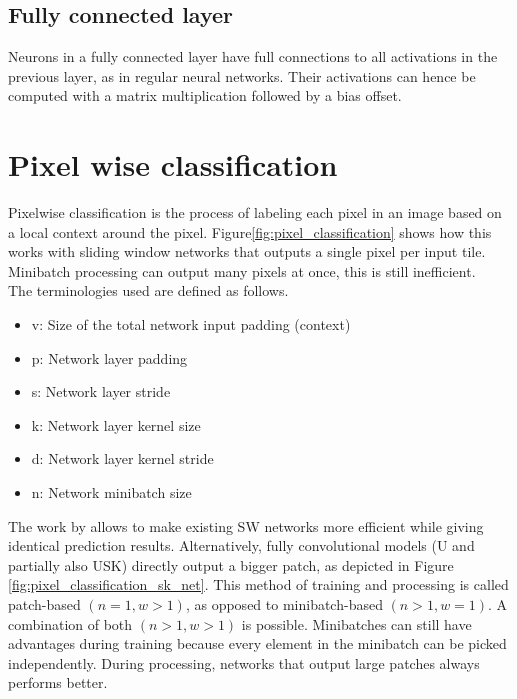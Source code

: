 \subsection{Fully connected layer}
Neurons in a fully connected layer have full connections to all activations in the previous layer, as in regular neural networks. Their activations can hence be computed with a matrix multiplication followed by a bias offset.   
 \section{Pixel wise classification}

Pixelwise classification is the process of labeling each pixel in an image based on a local context around the pixel. Figure\ref{fig:pixel_classification} shows how this works with sliding window networks that outputs a single pixel per input tile.
Minibatch processing can output many pixels at once, this is still inefficient. \\

The terminologies used are defined as follows. 
\begin{itemize}
\item v: Size of the total network input padding (context)
\item p: Network layer padding
\item s: Network layer stride 
\item k: Network layer kernel size 
\item d: Network layer kernel stride
\item n: Network minibatch size
\end{itemize}

The work by \cite{DBLP:journals/corr/LiZW14} allows to make existing SW networks more efficient while giving identical prediction results. Alternatively, fully convolutional models (U and partially also USK) directly output a bigger patch, as depicted in Figure \ref{fig:pixel_classification_sk_net}. This method of training and processing is called patch-based $(n = 1, w > 1)$, as opposed to minibatch-based $(n > 1, w = 1)$. A combination of both $(n > 1, w > 1)$ is possible.
Minibatches can still have advantages during training because every element in the minibatch can be picked independently. During processing, networks that output large patches always performs better.




